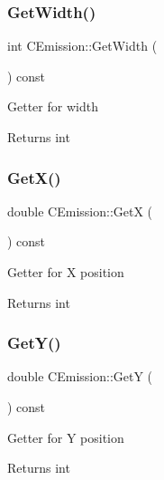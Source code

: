 \subsubsection{\texorpdfstring{GetWidth()}{GetWidth()}}
{\footnotesize\ttfamily int C\+Emission\+::\+Get\+Width (\begin{DoxyParamCaption}{ }\end{DoxyParamCaption}) const\hspace{0.3cm}{\ttfamily [inline]}}

Getter for width \begin{DoxyReturn}{Returns}
int 
\end{DoxyReturn}
\mbox{\label{class_c_emission_a92780d636d312e6e690537bf998bb6b4}} 
\subsubsection{\texorpdfstring{GetX()}{GetX()}}
{\footnotesize\ttfamily double C\+Emission\+::\+GetX (\begin{DoxyParamCaption}{ }\end{DoxyParamCaption}) const\hspace{0.3cm}{\ttfamily [inline]}}

Getter for X position \begin{DoxyReturn}{Returns}
int 
\end{DoxyReturn}
\mbox{\label{class_c_emission_a178c4908ee2d2012556a0555c2eacef1}} 
\subsubsection{\texorpdfstring{GetY()}{GetY()}}
{\footnotesize\ttfamily double C\+Emission\+::\+GetY (\begin{DoxyParamCaption}{ }\end{DoxyParamCaption}) const\hspace{0.3cm}{\ttfamily [inline]}}

Getter for Y position \begin{DoxyReturn}{Returns}
int 
\end{DoxyReturn}
\mbox{\label{class_c_emission_a7e9bc8eacb04a716a41cd10e2ed81b9d}} 
